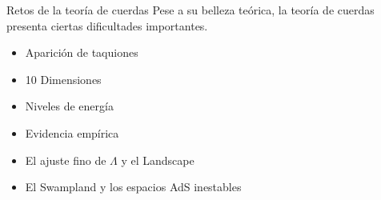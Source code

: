 


\begin{frame}{
Retos de la teoría de cuerdas
}
  Pese a su belleza teórica, la teoría de cuerdas presenta ciertas dificultades
  importantes.
  \begin{itemize}
    \item<2-> Aparición de taquiones
    \item<3-> 10 Dimensiones
    \item<4-> Niveles de energía
    \item<5-> Evidencia empírica
    \item<6-> El ajuste fino de $\Lambda$ y el Landscape
    \item<7> El Swampland y los espacios AdS inestables
  \end{itemize}
\end{frame}
